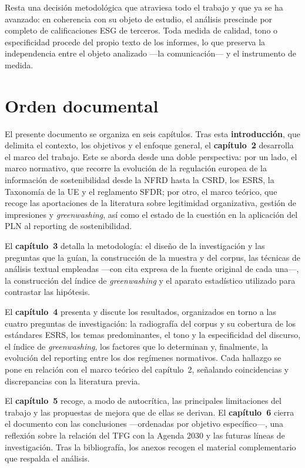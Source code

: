 Resta una decisión metodológica que atraviesa todo el trabajo y que ya
se ha avanzado: en coherencia con su objeto de estudio, el análisis prescinde por completo de
calificaciones ESG de terceros. Toda medida de calidad, tono o especificidad procede del
propio texto de los informes, lo que preserva la independencia entre el objeto analizado
—la comunicación— y el instrumento de medida.

\section{Orden documental}
\label{sec:orden}

El presente documento se organiza en seis capítulos. Tras esta \textbf{introducción}, que
delimita el contexto, los objetivos y el enfoque general, el \textbf{capítulo~2} desarrolla el
marco del trabajo. Este se aborda desde una doble perspectiva: por un lado, el marco
normativo, que recorre la evolución de la regulación europea de la información de
sostenibilidad desde la NFRD hasta la CSRD, los ESRS, la Taxonomía de la UE y el reglamento
SFDR; por otro, el marco teórico, que recoge las aportaciones de la literatura sobre
legitimidad organizativa, gestión de impresiones y \textit{greenwashing}, así como el estado
de la cuestión en la aplicación del PLN al reporting de sostenibilidad.

El \textbf{capítulo~3} detalla la metodología: el diseño de la investigación y las preguntas
que la guían, la construcción de la muestra y del corpus, las técnicas de análisis textual
empleadas —con cita expresa de la fuente original de cada una—, la construcción del índice de
\textit{greenwashing} y el aparato estadístico utilizado para contrastar las hipótesis.

El \textbf{capítulo~4} presenta y discute los resultados, organizados en torno a las cuatro
preguntas de investigación: la radiografía del corpus y su cobertura de los estándares ESRS,
los temas predominantes, el tono y la especificidad del discurso, el índice de
\textit{greenwashing}, los factores que lo determinan y, finalmente, la evolución del
reporting entre los dos regímenes normativos. Cada hallazgo se pone en relación con el marco
teórico del capítulo~2, señalando coincidencias y discrepancias con la literatura previa.

El \textbf{capítulo~5} recoge, a modo de autocrítica, las principales limitaciones del trabajo
y las propuestas de mejora que de ellas se derivan. El \textbf{capítulo~6} cierra el documento
con las conclusiones —ordenadas por objetivo específico—, una reflexión sobre la relación del
TFG con la Agenda 2030 y las futuras líneas de investigación. Tras la bibliografía, los anexos
recogen el material complementario que respalda el análisis.

